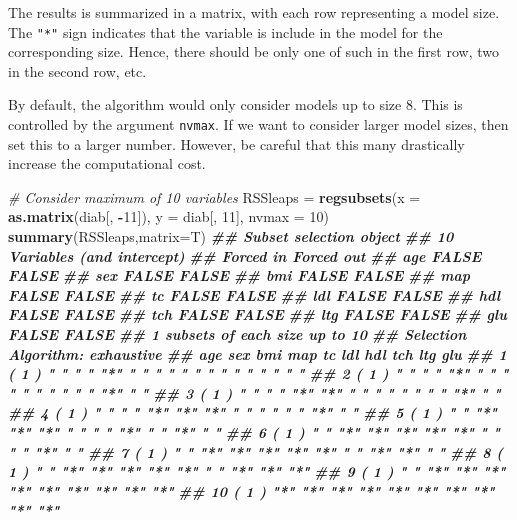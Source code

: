\documentclass[
]{book}
\newenvironment{Shaded}{\begin{snugshade}}{\end{snugshade}}
\newcommand{\AttributeTok}[1]{\textcolor[rgb]{0.13,0.29,0.53}{#1}}
\newcommand{\CommentTok}[1]{\textcolor[rgb]{0.56,0.35,0.01}{\textit{#1}}}
\newcommand{\DecValTok}[1]{\textcolor[rgb]{0.00,0.00,0.81}{#1}}
\newcommand{\DocumentationTok}[1]{\textcolor[rgb]{0.56,0.35,0.01}{\textbf{\textit{#1}}}}
\newcommand{\FunctionTok}[1]{\textcolor[rgb]{0.13,0.29,0.53}{\textbf{#1}}}
\newcommand{\NormalTok}[1]{#1}
\newcommand{\OtherTok}[1]{\textcolor[rgb]{0.56,0.35,0.01}{#1}}
\newcommand{\SpecialCharTok}[1]{\textcolor[rgb]{0.81,0.36,0.00}{\textbf{#1}}}
\theoremstyle{definition}
\theoremstyle{definition}
\theoremstyle{definition}
\theoremstyle{definition}
\theoremstyle{remark}
\begin{document}
The results is summarized in a matrix, with each row representing a model size. The \texttt{"*"} sign indicates that the variable is include in the model for the corresponding size. Hence, there should be only one of such in the first row, two in the second row, etc.

By default, the algorithm would only consider models up to size 8. This is controlled by the argument \texttt{nvmax}. If we want to consider larger model sizes, then set this to a larger number. However, be careful that this many drastically increase the computational cost.

\begin{Shaded}
\begin{Highlighting}[]
    \CommentTok{\# Consider maximum of 10 variables}
\NormalTok{    RSSleaps }\OtherTok{=} \FunctionTok{regsubsets}\NormalTok{(}\AttributeTok{x =} \FunctionTok{as.matrix}\NormalTok{(diab[, }\SpecialCharTok{{-}}\DecValTok{11}\NormalTok{]), }\AttributeTok{y =}\NormalTok{ diab[, }\DecValTok{11}\NormalTok{], }\AttributeTok{nvmax =} \DecValTok{10}\NormalTok{)}
    \FunctionTok{summary}\NormalTok{(RSSleaps,}\AttributeTok{matrix=}\NormalTok{T)}
\DocumentationTok{\#\# Subset selection object}
\DocumentationTok{\#\# 10 Variables  (and intercept)}
\DocumentationTok{\#\#     Forced in Forced out}
\DocumentationTok{\#\# age     FALSE      FALSE}
\DocumentationTok{\#\# sex     FALSE      FALSE}
\DocumentationTok{\#\# bmi     FALSE      FALSE}
\DocumentationTok{\#\# map     FALSE      FALSE}
\DocumentationTok{\#\# tc      FALSE      FALSE}
\DocumentationTok{\#\# ldl     FALSE      FALSE}
\DocumentationTok{\#\# hdl     FALSE      FALSE}
\DocumentationTok{\#\# tch     FALSE      FALSE}
\DocumentationTok{\#\# ltg     FALSE      FALSE}
\DocumentationTok{\#\# glu     FALSE      FALSE}
\DocumentationTok{\#\# 1 subsets of each size up to 10}
\DocumentationTok{\#\# Selection Algorithm: exhaustive}
\DocumentationTok{\#\#           age sex bmi map tc  ldl hdl tch ltg glu}
\DocumentationTok{\#\# 1  ( 1 )  " " " " "*" " " " " " " " " " " " " " "}
\DocumentationTok{\#\# 2  ( 1 )  " " " " "*" " " " " " " " " " " "*" " "}
\DocumentationTok{\#\# 3  ( 1 )  " " " " "*" "*" " " " " " " " " "*" " "}
\DocumentationTok{\#\# 4  ( 1 )  " " " " "*" "*" "*" " " " " " " "*" " "}
\DocumentationTok{\#\# 5  ( 1 )  " " "*" "*" "*" " " " " "*" " " "*" " "}
\DocumentationTok{\#\# 6  ( 1 )  " " "*" "*" "*" "*" "*" " " " " "*" " "}
\DocumentationTok{\#\# 7  ( 1 )  " " "*" "*" "*" "*" "*" " " "*" "*" " "}
\DocumentationTok{\#\# 8  ( 1 )  " " "*" "*" "*" "*" "*" " " "*" "*" "*"}
\DocumentationTok{\#\# 9  ( 1 )  " " "*" "*" "*" "*" "*" "*" "*" "*" "*"}
\DocumentationTok{\#\# 10  ( 1 ) "*" "*" "*" "*" "*" "*" "*" "*" "*" "*"}
    

\end{Highlighting}
\end{Shaded}
\end{document}
